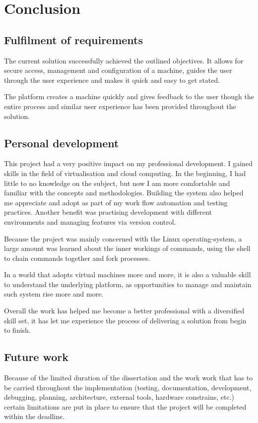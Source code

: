 \documentclass{article}
\begin{document}
\newpage
\section{Conclusion}

\subsection{Fulfilment of requirements}
The current solution successfully achieved the outlined objectives. It allows for secure access, management and configuration of a machine, guides the user through the user experience and makes it quick and easy to get stated. 

The platform creates a machine quickly and gives feedback to the user though the entire process and similar user experience has been provided throughout the solution. 

\subsection{Personal development}
This project had a very positive impact on my professional development. I gained skills in the field of virtualisation and cloud computing. In the beginning, I had little to no knowledge on the subject, but now I am more comfortable and familiar with the concepts and methodologies. Building the system also helped me appreciate and adopt as part of my work flow automation and testing practices. Another benefit was practising development with different environments and managing features via version control. 

Because the project was mainly concerned with the Linux \gls{operating-system}, a large amount was learned about the inner workings of commands, using the shell to chain commands together and fork processes. 

In a world that adopts virtual machines more and more, it is also a valuable skill to understand the underlying platform, as opportunities to manage and maintain such system rise more and more.

Overall the work has helped me become a better professional with a diversified skill set, it has let me experience the process of delivering a solution from begin to finish.

\subsection{Future work}
Because of the limited duration of the dissertation and the work work that has to be carried throughout the implementation (testing, documentation, development, debugging, planning, architecture, external tools, hardware constrains, etc.) certain limitations are put in place to ensure that the project will be completed within the deadline.
\end{document}
